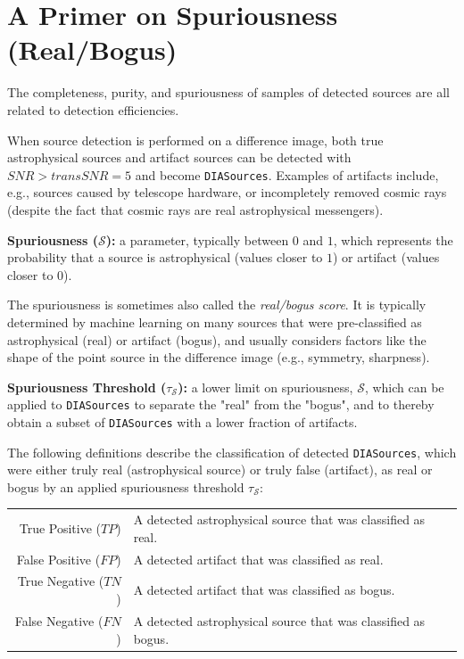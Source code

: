 \section{A Primer on Spuriousness (Real/Bogus)}\label{sec:rb}

The completeness, purity, and spuriousness of samples of detected sources are all related to detection efficiencies. 

When source detection is performed on a difference image, both true astrophysical sources and artifact sources can be detected with $SNR > {transSNR} = 5$ and become {\tt DIASources}.
Examples of artifacts include, e.g., sources caused by telescope hardware, or incompletely removed cosmic rays (despite the fact that cosmic rays are real astrophysical messengers). 

{\bf Spuriousness ($\mathcal{S}$):} a parameter, typically between $0$ and $1$, which represents the probability that a source is astrophysical (values closer to $1$) or artifact (values closer to $0$).

The spuriousness is sometimes also called the {\it real/bogus score}.
It is typically determined by machine learning on many sources that were pre-classified as astrophysical (real) or artifact (bogus), and usually considers factors like the shape of the point source in the difference image (e.g., symmetry, sharpness). 

{\bf Spuriousness Threshold ($\tau_{\mathcal{S}}$):} a lower limit on spuriousness, $\mathcal{S}$, which can be applied to {\tt DIASources} to separate the "real" from the "bogus", and to thereby obtain a subset of {\tt DIASources} with a lower fraction of artifacts. 

The following definitions describe the classification of detected {\tt DIASources}, which were either truly real (astrophysical source) or truly false (artifact), as real or bogus by an applied spuriousness threshold $\tau_{\mathcal{S}}$:

\begin{tabular}{rl}
True Positive ($\mathit{TP}$) & A detected astrophysical source that was classified as real. \\
False Positive ($\mathit{FP}$) & A detected artifact that was classified as real. \\
True Negative ($\mathit{TN}$) & A detected artifact that was classified as bogus. \\
False Negative ($\mathit{FN}$) & A detected astrophysical source that was classified as bogus. \\
\end{tabular}

